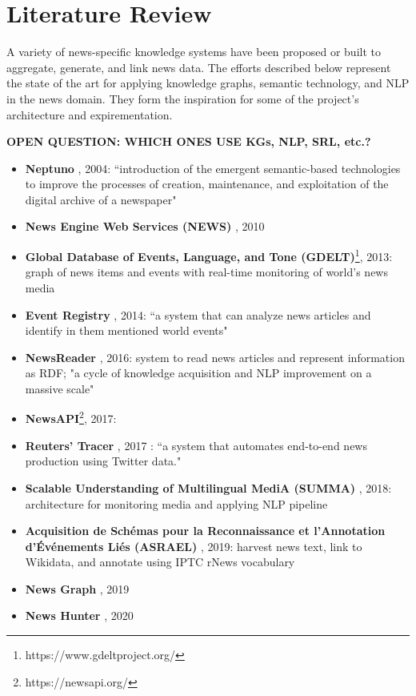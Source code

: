 \documentclass[11pt]{article}   	%
\begin{document}
\section{Literature Review}

A variety of news-specific knowledge systems have been proposed or built to aggregate, generate, and link news data. The efforts described below represent the state of the art for applying knowledge graphs, semantic technology, and NLP in the news domain. They form the inspiration for some of the project's architecture and expirementation.

\textbf{OPEN QUESTION: WHICH ONES USE KGs, NLP, SRL, etc.?}

\begin{itemize}
\item \textbf{Neptuno} \cite{castells2004neptuno}, 2004: ``introduction of the emergent semantic-based technologies to improve the processes of creation, maintenance, and exploitation of the digital archive of a newspaper"
\item \textbf{News Engine Web Services (NEWS)} \cite{fernandez2010news}, 2010
\item \textbf{Global Database of Events, Language, and Tone (GDELT)}\footnote{https://www.gdeltproject.org/}, 2013: graph of news items and events with real-time monitoring of world's news media
\item \textbf{Event Registry} \cite{leban2014event}, 2014: ``a system that can analyze news articles and identify in them mentioned world events"
\item \textbf{NewsReader} \cite{vossen2016newsreader}, 2016: system to read news articles and represent information as RDF; "a cycle of knowledge acquisition and NLP improvement on a massive scale"
\item \textbf{NewsAPI}\footnote{https://newsapi.org/}, 2017: 
\item \textbf{Reuters' Tracer} \cite{liu2017reuters}, 2017 : ``a system that automates end-to-end news production using Twitter data."
\item \textbf{Scalable Understanding of Multilingual MediA (SUMMA)} \cite{germann2018integrating}, 2018: architecture for monitoring media and applying NLP pipeline
\item \textbf{Acquisition de Schémas pour la Reconnaissance et l'Annotation d'Événements Liés (ASRAEL)} \cite{rudnik2019searching}, 2019: harvest news text, link to Wikidata, and annotate using IPTC rNews vocabulary
\item \textbf{News Graph} \cite{liu2019news}, 2019
\item \textbf{News Hunter} \cite{berven2020knowledge}, 2020



\end{itemize}
\end{document}
